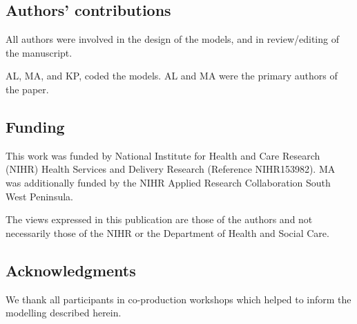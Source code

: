 \subsection{Authors' contributions}

All authors were involved in the design of the models, and in review/editing of the manuscript.

AL, MA, and KP, coded the models. AL and MA were the primary authors of the paper.


\subsection*{Funding}

This work was funded by National Institute for Health and Care Research (NIHR) Health Services and Delivery Research (Reference NIHR153982). MA was additionally funded by the NIHR Applied Research Collaboration South West Peninsula.

The views expressed in this publication are those of the authors and not necessarily those
of the NIHR or the Department of Health and Social Care.

\subsection*{Acknowledgments}

We thank all participants in co-production workshops which helped to inform the modelling described herein.